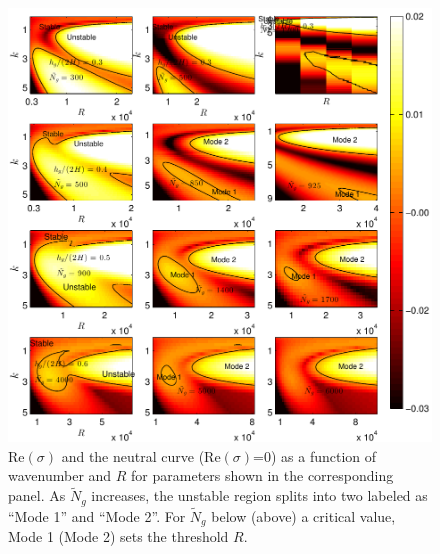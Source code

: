 \documentclass[12pt]{report}   %
\newcommand{\Rey}{{R}}
\newcommand{\Ndg}{\tilde{N}_g}
\begin{document}
\begin{figure}
 \centerline{\includegraphics[]{SetAll_imgsc4}}

\caption{
$\text{Re}(\sigma)$ and the neutral curve ($\text{Re}(\sigma)$=0) as a function of wavenumber and $\Rey$ for parameters shown in the corresponding panel.  
As $\Ndg$ increases, the unstable region splits into two labeled as ``Mode 1'' and ``Mode 2''. 
For $\Ndg$ below (above) a critical value, Mode 1 (Mode 2) sets the threshold $\Rey$.
}
\label{K_Re_sigma_set3}
\end{figure}
\end{document}
